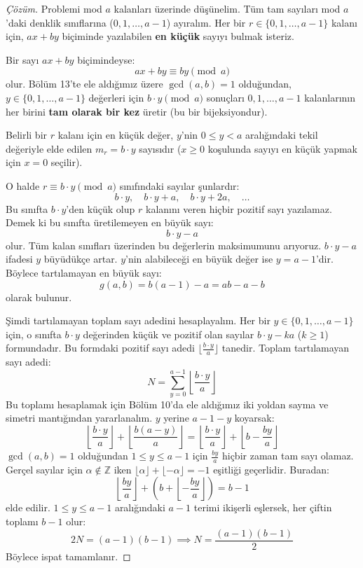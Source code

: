 \begin{proof}[Çözüm]
Problemi mod $a$ kalanları üzerinde düşünelim.
Tüm tam sayıları mod $a$'daki denklik sınıflarına ($0, 1, \dots, a-1$) ayıralım.
Her bir $r \in \{0, 1, \dots, a-1\}$ kalanı için, $ax + by$ biçiminde yazılabilen \textbf{en küçük} sayıyı bulmak isteriz.

Bir sayı $ax + by$ biçimindeyse:
\[
ax + by \equiv by \pmod a
\]
olur. Bölüm 13'te ele aldığımız üzere $\gcd(a, b) = 1$ olduğundan, $y \in \{0, 1, \dots, a-1\}$ değerleri için $b \cdot y \pmod a$ sonuçları $0, 1, \dots, a-1$ kalanlarının her birini \textbf{tam olarak bir kez} üretir (bu bir bijeksiyondur).

Belirli bir $r$ kalanı için en küçük değer, $y$'nin $0 \le y < a$ aralığındaki tekil değeriyle elde edilen $m_r = b \cdot y$ sayısıdır ($x \ge 0$ koşulunda sayıyı en küçük yapmak için $x=0$ seçilir).

O halde $r \equiv b \cdot y \pmod a$ sınıfındaki sayılar şunlardır:
\[
b \cdot y, \quad b \cdot y + a, \quad b \cdot y + 2a, \quad \dots
\]
Bu sınıfta $b \cdot y$'den küçük olup $r$ kalanını veren hiçbir pozitif sayı yazılamaz. Demek ki bu sınıfta üretilemeyen en büyük sayı:
\[
b \cdot y - a
\]
olur. Tüm kalan sınıfları üzerinden bu değerlerin maksimumunu arıyoruz. $b \cdot y - a$ ifadesi $y$ büyüdükçe artar. $y$'nin alabileceği en büyük değer ise $y = a - 1$'dir.
Böylece tartılamayan en büyük sayı:
\[
g(a, b) = b(a - 1) - a = ab - a - b
\]
olarak bulunur.

Şimdi tartılamayan toplam sayı adedini hesaplayalım.
Her bir $y \in \{0, 1, \dots, a-1\}$ için, o sınıfta $b \cdot y$ değerinden küçük ve pozitif olan sayılar $b \cdot y - ka$ ($k \ge 1$) formundadır. Bu formdaki pozitif sayı adedi $\lfloor \frac{b \cdot y}{a} \rfloor$ tanedir.
Toplam tartılamayan sayı adedi:
\[
N = \sum_{y=0}^{a-1} \left\lfloor \frac{b \cdot y}{a} \right\rfloor
\]
Bu toplamı hesaplamak için Bölüm 10'da ele aldığımız iki yoldan sayma ve simetri mantığından yararlanalım. $y$ yerine $a - 1 - y$ koyarsak:
\[
\left\lfloor \frac{b \cdot y}{a} \right\rfloor + \left\lfloor \frac{b(a - y)}{a} \right\rfloor = \left\lfloor \frac{b \cdot y}{a} \right\rfloor + \left\lfloor b - \frac{by}{a} \right\rfloor
\]
$\gcd(a, b) = 1$ olduğundan $1 \le y \le a-1$ için $\frac{by}{a}$ hiçbir zaman tam sayı olamaz. Gerçel sayılar için $\alpha \notin \mathbb{Z}$ iken $\lfloor \alpha \rfloor + \lfloor -\alpha \rfloor = -1$ eşitliği geçerlidir. Buradan:
\[
\left\lfloor \frac{by}{a} \right\rfloor + \left( b + \left\lfloor -\frac{by}{a} \right\rfloor \right) = b - 1
\]
elde edilir. $1 \le y \le a-1$ aralığındaki $a-1$ terimi ikişerli eşlersek, her çiftin toplamı $b - 1$ olur:
\[
2N = (a - 1)(b - 1) \implies N = \frac{(a - 1)(b - 1)}{2}
\]
Böylece ispat tamamlanır.
\end{proof}


